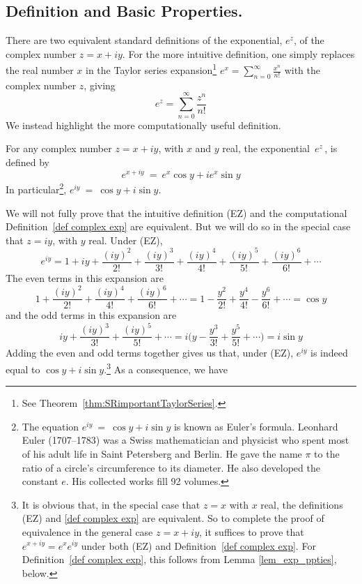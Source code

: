 \subsection{Definition and Basic Properties.}\label{ssec complex exp def}
There are two equivalent standard definitions of the exponential, $e^z$,
of the complex number $z=x+iy$. For the more intuitive definition, one simply 
replaces the real number $x$ in the Taylor series expansion\footnote{See Theorem~\ref{thm:SRimportantTaylorSeries}.}
$e^x=\sum_{n=0}^\infty \frac{x^n}{n!}$ with the complex number $z$, giving
\begin{equation*}
e^z=\sum_{n=0}^\infty \frac{z^n}{n!}
\tag{EZ}\end{equation*}
 We instead highlight the more computationally useful definition. 
\begin{defn}\label{def complex exp}
For any complex number $z=x+iy$, with $x$ and $y$ real, the exponential 
$\, e^z\, $, is defined by
\begin{equation*}
e^{x+iy}\ =\ e^x\cos y+i e^x\sin y
\end{equation*}
In particular\footnote{The equation $e^{iy}\ =\ \cos y+i \sin y$ is known as Euler's formula. Leonhard Euler (1707--1783) was a  Swiss mathematician and physicist who spent most of his adult life in Saint Petersberg and Berlin. He gave the name $\pi$ to the ratio of a circle's circumference to its diameter. He also developed the constant $e$. His collected works fill 92 volumes.}, $e^{iy}\ =\ \cos y+i \sin y$.
\end{defn}
We will not fully prove that the intuitive definition (EZ) and the computational
Definition~\ref{def complex exp} are equivalent. But we will do so in the special case that $z=iy$, with $y$ real. Under (EZ),
\begin{equation*}
e^{iy} = 1 +iy +\frac{(iy)^2}{2!}+\frac{(iy)^3}{3!}+\frac{(iy)^4}{4!}
+\frac{(iy)^5}{5!}+\frac{(iy)^6}{6!}+\cdots
\end{equation*}
The even terms in this expansion are
\begin{equation*}
1  +\frac{(iy)^2}{2!}+\frac{(iy)^4}{4!}+\frac{(iy)^6}{6!}+\cdots
=1  -\frac{y^2}{2!}+\frac{y^4}{4!}-\frac{y^6}{6!}+\cdots
=\cos y
\end{equation*}
and the odd terms in this expansion are
\begin{equation*}
 iy +\frac{(iy)^3}{3!}+\frac{(iy)^5}{5!}+\cdots
=i\Big(y-\frac{y^3}{3!}+\frac{y^5}{5!}+\cdots\Big)
=i\sin y
\end{equation*}
Adding the even and odd terms together gives us that, under (EZ), $e^{iy}$ is indeed equal to $\cos y + i\sin y$.\footnote{It is obvious that, in the special case that $z=x$ with $x$ real, the definitions (EZ) and \ref{def complex exp} are equivalent. So to complete the proof of equivalence in the general case $z=x+iy$, it suffices to prove that $e^{x+iy}=e^x e^{iy}$ under both (EZ) and 
Definition~\ref{def complex exp}. For Definition~\ref{def complex exp}, this follows from Lemma \ref{lem_exp_ppties}, below.} As a consequence, we have
